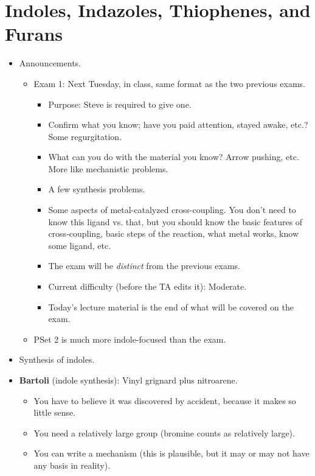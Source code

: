 \documentclass[../notes.tex]{subfiles}
\begin{document}
\section{Indoles, Indazoles, Thiophenes, and Furans}
\begin{itemize}
    \item {}Announcements.
    \begin{itemize}
        \item Exam 1: Next Tuesday, in class, same format as the two previous exams.
        \begin{itemize}
            \item Purpose: Steve is required to give one.
            \item Confirm what you know; have you paid attention, stayed awake, etc.? Some regurgitation.
            \item What can you do with the material you know? Arrow pushing, etc. More like mechanistic problems.
            \item A few synthesis problems.
            \item Some aspects of metal-catalyzed cross-coupling. You don't need to know this ligand vs. that, but you should know the basic features of  cross-coupling, basic steps of the reaction, what metal works, know some ligand, etc.
            \item The exam will be \emph{distinct} from the previous exams.
            \item Current difficulty (before the TA edits it): Moderate.
            \item Today's lecture material is the end of what will be covered on the exam.
        \end{itemize}
        \item PSet 2 is much more indole-focused than the exam.
    \end{itemize}
    \item Synthesis of indoles.
    \item \textbf{Bartoli} (indole synthesis): Vinyl grignard plus nitroarene.
    \begin{itemize}
        \item You have to believe it was discovered by accident, because it makes so little sense.
        \item You need a relatively large  group (bromine counts as relatively large).
        \item You can write a mechanism (this is plausible, but it may or may not have any basis in reality).

\end{itemize}
\end{itemize}
\end{document}
